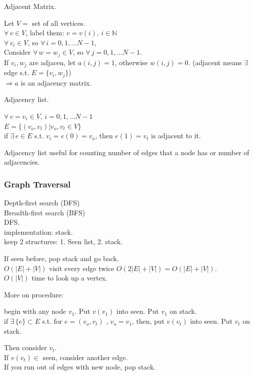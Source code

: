 \documentclass[10pt]{amsart}
\begin{document}
Adjacent Matrix. 

Let $V=$ set of all vertices. \\
$\forall \, v \in V$, label them: $v=v(i)$, $i \in \mathbb{N}$ \\

$\forall \, v_i \in V$, so $\forall \, i = 0, 1, \dots N-1$, \\
Consider $\forall \, w = w_j \in V$, so $\forall \, j = 0 , 1, \dots N-1$. \\

If $v_i, w_j$ are adjacen, let $a(i,j) = 1$, otherwise $w(i,j) =0$. (adjacent means $\exists \,$ edge s.t. $E = \lbrace v_i, w_j \rbrace$) \\
$\Longrightarrow a$ is an adjacency matrix. 

Adjacency list. 

$\forall \, v = v_i \in V$, $i=0,1,\dots N-1$ \\
$E = \lbrace (v_o, v_t) | v_o, v_t \in V \rbrace$ \\
if $\exists \, e \in E$ s.t. $v_i = e(0) = v_o$, then $e(1) = v_t$ is adjacent to it. 

Adjacency list useful for counting number of edges that a node has or number of adjacencies.


\subsubsection{Graph Traversal}  

Depth-first search (DFS) \\
Breadth-first search (BFS) \\

DFS. \\
implementation: stack. \\
keep 2 structures: 1. Seen list, 2. stack. 

If seen before, pop stack and go back. \\
$O(|E| + |V|)$ visit every edge twice $O(2|E| + |V|) = O(|E| + |V|)$. \\
$O(|V|)$ time to look up a vertex. 

More on procedure:

begin with any node $v_1$. Put $v(v_1)$ into seen. Put $v_1$ on stack. \\
if $\exists \, \lbrace e \rbrace \subset E$ s.t. for $e = (v_o, v_t)$ , $v_o = v_1$, then, put $v(v_t)$ into seen. Put $v_t$ on stack.

Then consider $v_t$. \\
If $v(v_t) \in $ seen, consider another edge. \\
If you run out of edges with new node, pop stack. 
\end{document}
